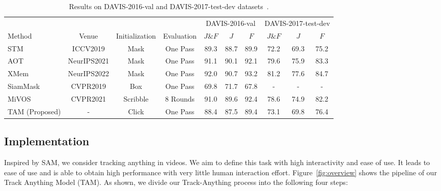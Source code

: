\documentclass{article}
\begin{document}
\begin{table}
  \caption{Results on DAVIS-2016-val and DAVIS-2017-test-dev datasets~\cite{davis}.}
  \label{davis1617}
  \centering
   \small
   \setlength\tabcolsep{4pt}
  \begin{tabular}{l|c|c|c|ccc|ccc}
    \toprule
    & & & &\multicolumn{3}{c|}{DAVIS-2016-val} &\multicolumn{3}{c}{DAVIS-2017-test-dev} \\
    Method & Venue & Initialization & Evaluation& $J\&F$ & $J$ &$F$ &$J\&F$ & $J$ &$F$\\
    \midrule
    STM~\cite{stm} & ICCV2019 &Mask & One Pass &89.3 &88.7 &89.9 & 72.2 & 69.3 & 75.2 \\
    AOT~\cite{aot} &NeurIPS2021 &Mask & One Pass & 91.1 & 90.1 & 92.1 &  79.6 & 75.9 & 83.3 \\
    XMem~\cite{xmem} & NeurIPS2022 &Mask & One Pass & 92.0 &90.7 &93.2 &  81.2 & 77.6 & 84.7\\
    \midrule
    SiamMask~\cite{siammask}& CVPR2019 &Box & One Pass & 69.8 &71.7 &67.8 &- &- &- \\
    \midrule
    MiVOS~\cite{mivos} & CVPR2021 &Scribble &8 Rounds &91.0 &89.6 &92.4 &78.6 &74.9 &82.2\\
    \midrule
    TAM (Proposed) &- & Click & One Pass & 88.4 & 87.5 &89.4 & 73.1 & 69.8 & 76.4\\
    \bottomrule
  \end{tabular}
\end{table}



\subsection{Implementation}\label{implementation}

Inspired by SAM, we consider tracking anything in videos.
We aim to define this task with high interactivity and ease of use.
It leads to ease of use and is able to obtain high performance with very little human interaction effort.
Figure~\ref{fig:overview} shows the pipeline of our Track Anything Model (TAM).
As shown, we divide our Track-Anything process into the following four steps:
\end{document}
